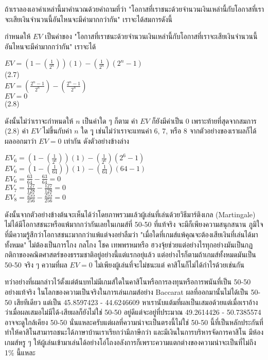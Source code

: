 \documentclass[12pt]{article}
\begin{document}
ถ้าเราลองเอาค่าเหล่านี้มาคำนวณด้วยคำถามที่ว่า "โอกาสที่เราชนะด้วยจำนวนเงินเหล่านี้กับโอกาสที่เราจะเสียเงินจำนวนนี้อันไหนจะมีค่ามากกว่ากัน" เราจะได้สมการดังนี้ 

กำหนดให้ $EV$ เป็นค่าของ "โอกาสที่เราชนะด้วยจำนวนเงินเหล่านี้กับโอกาสที่เราจะเสียเงินจำนวนนี้อันไหนจะมีค่ามากกว่ากัน" เราจะได้
\begin{center}
$EV=(1-(\frac{1}{2^n}))(1) - (\frac{1}{2^n})(2^n-1)$\\
(2.7)\\
$EV=(\frac{2^n-1}{2^n}) - (\frac{2^n-1}{2^n})$\\
$EV=0$\\
(2.8)
\end{center}

ดังนั้นไม่ว่าเราจะกำหนดให้ $n$ เป็นค่าใด ๆ ก็ตาม ค่า $EV$ ก็ยังมีค่าเป็น 0 เพราะท้ายที่สุดจากสมการ (2.8) ค่า $EV$ ไม่ขึ้นกับค่า $n$ ใด ๆุ เช่นไม่ว่าเราจะแทนค่า 6, 7, หรือ 8 จากตัวอย่างของเราผลก็ได้ผลออกมาว่า $EV=0$ เท่ากัน ดังตัวอย่างข้างล่าง

\begin{center}
$EV_6=(1-(\frac{1}{2^6}))(1) - (\frac{1}{2^6})(2^6-1)$\\
$EV_6=(1-(\frac{1}{64}))(1) - (\frac{1}{64})(64-1)$\\
$EV_6=\frac{63}{64} - \frac{63}{64}=0$\\
$EV_7=\frac{127}{128} - \frac{127}{128}=0$\\
$EV_8=\frac{255}{256} - \frac{255}{256}=0$\\
\end{center}

ดังนั้นจากตัวอย่างข้างต้นจะเห็นได้ว่าโดยภาพรวมแล้วผู้เล่นที่เล่นด้วยวิธีมาร์ติงเกล (Martingale) ไม่ได้มีโอกาสชนะหรือแพ้มากกว่ากันเลยในเกมส์ที่ 50-50 ที่แท้จริง จะมีก็เพียงความสนุกสนาน ภูมิใจที่มีความรู้สึกว่าโอกาสชนะมากกว่าแพ้แต่จงอย่าลืมว่า "เมื่อใดที่เกมส์แพ้คุณจะต้องเสียเงินที่เล่นได้มาทั้งหมด" ไม่ต้องเป็นการโกง กลโกง โชค เทพพรหมหรือ ฮวงจุ้ยช่วยแต่อย่างไรทุกอย่างมันเป็นกฏกติกาของคณิตศาสตร์ของธรรมชาติอยู่อย่างนี้แต่แรกอยุ่แล้ว แต่อย่างไรก็ตามถ้าเกมส์ทั้งหมดมันเป็น 50-50 จริง ๆ ความที่ผล $EV=0$  ไม่เพียงผู้เล่นที่จะไม่ชนะแต่ คาสิโนก็ไม่ได้กำไรด้วยเช่นกัน

ทว่าอย่างที่ผมกล่าวไว้ตั้งแต่ต้นบทไม่มีเกมส์ใดในคาสิโนหรือการลงทุนหรือการพนันที่เป็น 50-50 อย่างแท้จริง ในโลกของความเป็นจริงในการเล่นเกมส์อย่าง Baccarat ผลที่ออกมานั้นไม่ได้เป็น 50-50 เสียทีเดียว แต่เป็น 45.8597423 - 44.6246609 หาเรานับแต้มที่ผลเป็นเสมอด้วยแต่เมื่อเราอ้างว่าเมื่อผลเสมอไม่มีได้-เสียผลก็ยังไม่ใช่ 50-50 อยู่ดีแต่จะอยู่ที่ประมาณ 49.2614426 - 50.7385574 อาจจะดูใกล้เคียง 50-50 นั่นแหละครับแต่ผลที่ความน่าจะเป็นตรงนี้ไม่ใช่ 50-50 นี้ที่เป็นหลักประกันที่ทำให้คาสิโนสามารถชนะได้ภาษาบ้านเราเรียกว่ามีภาษีกว่า และมีเงินในการบริหารจัดการคาสิโน มีห้องเกมส์หรู ๆ ให้ผู้เล่นเข้ามาเล่นได้อย่างโอ่โถงอลังการก็เพราะความแตกต่างของความน่าจะเป็นที่ไม่ถึง 1\% นี้แหละ
\end{document}
